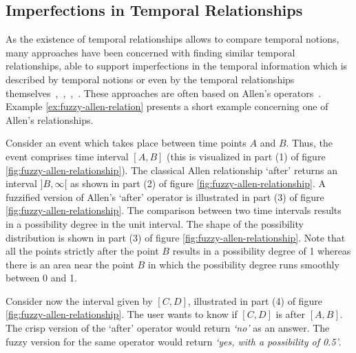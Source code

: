 \subsection{Imperfections in Temporal Relationships}
As the existence of temporal relationships allows to compare temporal notions, many approaches have been concerned with finding similar temporal relationships, able to support imperfections in the temporal information which is described by temporal notions or even by the temporal relationships themselves~\cite{ohlbach2004},~\cite{nagypal2003},~\cite{schockaert08},~\cite{Dubois:jucs_9_9:fuzziness_and_uncertainty_in}. These approaches are often based on Allen's operators~\cite{Allen83}. Example \ref{ex:fuzzy-allen-relation} presents a short example concerning one of Allen's relationships.


\begin{example}
\label{ex:fuzzy-allen-relation}
Consider an event which takes place between time points $A$ and $B$. Thus, the event comprises time interval $[A,B]$ (this is visualized in part (1) of figure \ref{fig:fuzzy-allen-relationship}). The classical Allen relationship `after' returns an interval $]B,\infty[$ as shown in part (2) of figure \ref{fig:fuzzy-allen-relationship}. A fuzzified version of Allen's `after' operator is illustrated in part (3) of figure \ref{fig:fuzzy-allen-relationship}. The comparison between two time intervals results in a possibility degree in the unit interval. The shape of the possibility distribution is shown in part (3) of figure \ref{fig:fuzzy-allen-relationship}. Note that all the points strictly after the point $B$ results in a possibility degree of 1 whereas there is an area near the point $B$ in which the possibility degree runs smoothly between 0 and 1. 

Consider now the interval given by $[C,D]$, illustrated in part (4) of figure \ref{fig:fuzzy-allen-relationship}. The user wants to know if $[C,D]$ is after $[A,B]$. The crisp version of the `after' operator would return \emph{`no'} as an answer. The fuzzy version for the same operator would return \emph{`yes, with a possibility of 0.5'}.



\end{example}
